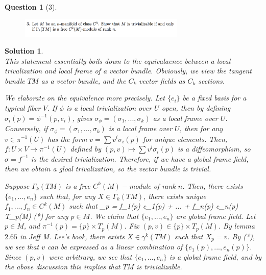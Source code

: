 \documentclass{article} %
\def\eQb#1\eQe{\begin{eqnarray*}#1\end{eqnarray*}}
\theoremstyle{quest}
\newtheorem*{question}{Question}
\newtheorem*{solution}{Solution}
\begin{document}
\newpage

\begin{question}[3]
\hfill
\begin{figure}[h!]
  \centering
    \includegraphics[width=0.7\textwidth]{DG-e3-p3.png}
\end{figure}
\end{question}
\begin{solution} \hfill \\
This statement essentially boils down to the equivalaence between a local
trivalization and local frame of a vector bundle. Obviously, we view the
tangent bundle $TM$ as a vector bundle, and the $C_k$ vector fields as
$C_k$ sections. 

\bigskip

We elaborate on the equivalence more precisely. Let $\{e_i\}$ be a fixed basis
for a typical fiber $V$. 
If $\phi$
is a local trivialization over $U$ open, then by defining 
$\sigma_i(p) = \phi^{-1}(p,e_i)$, gives $\sigma_{\phi} = (\sigma_1,...,\sigma_k)$
as a local frame over $U$. Conversely, if $\sigma_{\phi} = (\sigma_1,...,\sigma_k)$
is a local frame over $U$, then for any $v \in \pi^{-1}(U)$ has the form $v
= \sum v^{i} \sigma_{i}(p)$ for unique elements. Then, $f:U \times V \to \pi^{-1}
(U)$ defined by $(p,v) \mapsto \sum v^{i} \sigma_i(p)$ is a diffeomorphism, so 
$\sigma = f^{-1}$ is the desired trivialization. Therefore, if we have a global 
frame field, then we obtain a gloal trivalization, so the vector bundle is 
trivial.  

\bigskip 

Suppose $\Gamma_{k}(TM)$ is a free $C^k(M)-$module of rank $n$. Then,
there exists $\{e_1, ..., e_n\}$ such that, for any $ X \in \Gamma_k(TM)$,
there exists unique $f_1,...,f_n \in C^k(M)$ such that  
\eQb
X_p = f_1(p) e_1(p) + ... + f_n(p) e_n(p) \in T_{p}(M) \>\>\> (*)
\eQe 
for any $p \in M$. We claim that $\{e_1,...,e_n\}$ are global frame field. Let 
$p \in M$, and $\pi^{-1}(p) = \{p\} \times T_{p}(M)$. Fix $(p,v) \in \{p\} 
\times T_{p}(M)$. By lemma $2.65$ in Jeff M. Lee's book, there exists $X \in 
\gamma^{k}(TM)$ such that $X_p = v$. By (*), we see that $v$ can be
expressed as a linear combination of $\{e_1(p), ..., e_n(p)\}$. Since $(p,v)$
were arbitrary, we see that $\{e_1, ..., e_n\}$ is a global frame field, and
by the above discussion this implies that $TM$ is trivializable. 


\end{solution}
\end{document}
